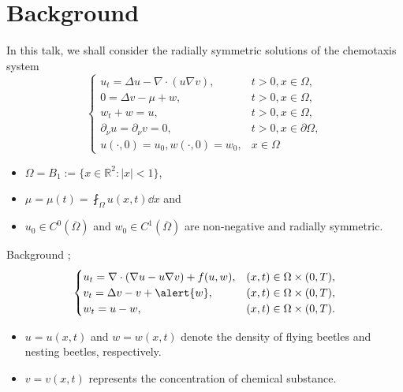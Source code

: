 \section{Background}

\begin{frame}
In this talk, we shall consider the radially symmetric solutions of the chemotaxis system
\begin{equation}\nonumber
\begin{cases}
		u_t = \Delta u - \nabla \cdot(u\nabla v),&  t>0, x\in\Omega,\\
		0 =  \Delta v - \mu + w,&  t>0, x\in\Omega,	\\
		w_t + w = u, &  t > 0, x\in\Omega, \\
		\partial_\nu u = \partial_\nu v = 0 , & t >0, x\in\partial\Omega,\\
		u(\cdot, 0) = u_0, w(\cdot, 0) = w_0, & x\in\Omega
\end{cases}
\end{equation}
\begin{itemize}
    \item $\Omega = B_1:=\{x\in\mathbb{R}^2:|x|<1\}$,
    \item $\mu = \mu(t) = \fint_\Omega u(x, t)\dd x$ and 
    \item \(u_0\in C^0(\overline{\Omega})\) and  \(w_0\in C^1(\overline{\Omega})\) are non-negative and radially symmetric.
\end{itemize}

\end{frame}


\begin{frame}{Background}
; 
\begin{equation}\nonumber
	\begin{cases}
		u_t = \nabla\cdot(\nabla u - u\nabla v) + f(u,w), & (x, t)\in \Omega\times(0, T),\\
		v_t = \Delta v - v + \alert{w}, & (x, t)\in \Omega\times(0, T),\\
		w_t = u - w, & (x, t)\in \Omega\times(0, T).
	\end{cases}
\end{equation}
\begin{itemize}
    \item $u = u(x, t)$ and $w = w(x, t)$ denote the density of flying beetles and nesting beetles, respectively.
    \item $v = v(x, t)$ represents the concentration of chemical substance.
\end{itemize}
\end{frame}

